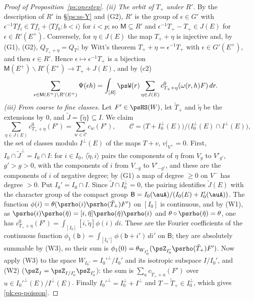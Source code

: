 \documentclass[10pt]{amsart}
\theoremstyle{definition}
\theoremstyle{remark}
\begin{document}
\begin{proof}[Proof of Proposition~\ref{ps:onestep}]
\emph{(ii) The orbit of $T_+$ under $R'$.} By the description of $R'$ in \S\ref{ps:ss-Y} and (G2),
$R'$ is the group of $\epsilon\in G'$ with $\epsilon^{-1}Tf_i\in Tf_i+\langle Tf_b:b<i\rangle$ for
$i<p$; so $\mathsf M\subseteq R'$ and $\epsilon^{-1}T_+-T_+\in J(E)$ for $\epsilon\in R'(E^+)$.
Conversely, for $\eta\in J(E)$ the map $T_++\eta$ is injective and, by (G1), (G2),
$Q_{T_++\eta}=Q_T$; by Witt's theorem $T_++\eta=\epsilon^{-1}T_+$ with $\epsilon\in G'(E^+)$, and
then $\epsilon\in R'$. Hence $\epsilon\mapsto\epsilon^{-1}T_+$ is a bijection $\mathsf M(E^+)
\backslash R'(E^+)\to T_++J(E)$, and by (c2)
\begin{equation}\label{pk:eq-ii}
\sum_{\epsilon\in\mathsf M(E^+)\backslash R'(E^+)}\Psi(\epsilon h)=\int_{[R]}\psW(r)\sum_{\eta\in
J(E)}c^0_{T_++\eta}(\omega(r,h)F)\,dr .
\end{equation}
\emph{(iii) From coarse to fine classes.} Let $F'\in\psHS(W)$, let $\tilde T_+$ and $\tilde\eta$
be the extensions by $0$, and $\tilde J=\{\tilde\eta\}\subseteq I$. We claim
\begin{equation}\label{pk:eq-poisson}
\sum_{\eta\in J(E)}c^0_{T_++\eta}(F')=\sum_{w\in\mathcal C}c_w(F'),\qquad\mathcal C=\bigl(T+I_0^\perp
(E)\bigr)\big/\bigl(I_0^\perp(E)\cap I^\perp(E)\bigr),
\end{equation}
the set of classes modulo $I^\perp(E)$ of the maps $T+v$, $v|_{V^+}=0$. First, $I_0\cap\tilde
J^\perp=I_0\cap I$: for $i\in I_0$, $\langle\tilde\eta,i\rangle$ pairs the components of $\eta$
from $V_g$ to $V'_{g'}$, $g'>g>0$, with the components of $i$ from $V_{-g}$ to $V'_{-g'}$, and
these are the components of $i$ of negative degree; by (G1) a map of degree $\ge0$ on $V^-$ has
degree $>0$. Put $I_0'=I_0\cap I$. Since $\tilde J\cap I_0^\perp=0$, the pairing identifies
$\tilde J(E)$ with the character group of the compact group $\mathsf B=I_0(\auA)/(I_0(E)+
I_0'(\auA))$. The function $\phi(i)=\theta(\psrho(i)\psrho(\tilde T_+)F')$ on $[I_0]$ is
continuous, and by (W1), as $\psrho(i)\psrho(\tilde\eta)=[i,\tilde\eta]\psrho(\tilde\eta)\psrho(i)$
and $\theta\circ\psrho(\tilde\eta)=\theta$, one has $c^0_{T_++\eta}(F')=\int_{[I_0]}[i,\tilde\eta]
\phi(i)\,di$. These are the Fourier coefficients of the continuous function
$\phi_1(\mathsf b)=\int_{[I_0']}\phi(\mathsf b+i')\,di'$ on $\mathsf B$; they are absolutely
summable by (W3), so their sum is $\phi_1(0)=\theta_{W_{I_0'}}(\psZ_{I_0'}\psrho(\tilde T_+)F')$.
Now apply (W3) to the space $W_{I_0'}=I_0'^\perp/I_0'$ and its isotropic subspace $I/I_0'$, and
(W2) ($\psZ_I=\psZ_{I/I_0'}\psZ_{I_0'}$): the sum is $\sum_uc_{\tilde T_++u}(F')$ over
$u\in I_0'^\perp(E)/I^\perp(E)$. Finally $I_0'^\perp=I_0^\perp+I^\perp$ and $T-\tilde T_+\in
I_0^\perp$, which gives \eqref{pk:eq-poisson}.


\end{proof}
\end{document}
